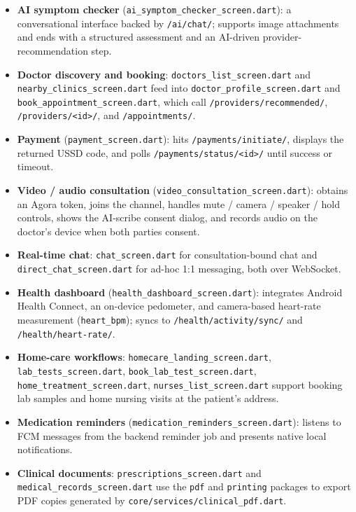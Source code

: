 \begin{itemize}
  \item \textbf{AI symptom checker} (\texttt{ai\_symptom\_checker\_screen.dart}): a conversational interface backed by \texttt{/ai/chat/}; supports image attachments and ends with a structured assessment and an AI-driven provider-recommendation step.
  \item \textbf{Doctor discovery and booking}: \texttt{doctors\_list\_screen.dart} and \texttt{nearby\_clinics\_screen.dart} feed into \texttt{doctor\_profile\_screen.dart} and \texttt{book\_appointment\_screen.dart}, which call \texttt{/providers/recommended/}, \texttt{/providers/<id>/}, and \texttt{/appointments/}.
  \item \textbf{Payment} (\texttt{payment\_screen.dart}): hits \texttt{/payments/initiate/}, displays the returned USSD code, and polls \texttt{/payments/status/<id>/} until success or timeout.
  \item \textbf{Video / audio consultation} (\texttt{video\_consultation\_screen.dart}): obtains an Agora token, joins the channel, handles mute / camera / speaker / hold controls, shows the AI-scribe consent dialog, and records audio on the doctor's device when both parties consent.
  \item \textbf{Real-time chat}: \texttt{chat\_screen.dart} for consultation-bound chat and \texttt{direct\_chat\_screen.dart} for ad-hoc 1:1 messaging, both over WebSocket.
  \item \textbf{Health dashboard} (\texttt{health\_dashboard\_screen.dart}): integrates Android Health Connect, an on-device pedometer, and camera-based heart-rate measurement (\texttt{heart\_bpm}); syncs to \texttt{/health/activity/sync/} and \texttt{/health/heart-rate/}.
  \item \textbf{Home-care workflows}: \texttt{homecare\_landing\_screen.dart}, \texttt{lab\_tests\_screen.dart}, \texttt{book\_lab\_test\_screen.dart}, \texttt{home\_treatment\_screen.dart}, \texttt{nurses\_list\_screen.dart} support booking lab samples and home nursing visits at the patient's address.
  \item \textbf{Medication reminders} (\texttt{medication\_reminders\_screen.dart}): listens to FCM messages from the backend reminder job and presents native local notifications.
  \item \textbf{Clinical documents}: \texttt{prescriptions\_screen.dart} and \texttt{medical\_records\_screen.dart} use the \texttt{pdf} and \texttt{printing} packages to export PDF copies generated by \texttt{core/services/clinical\_pdf.dart}.
\end{itemize}

